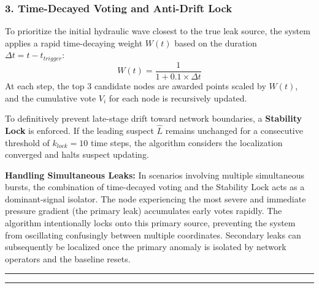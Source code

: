 \documentclass[final,5p,times,twocolumn,authoryear]{elsarticle}
\begin{document}
\subsubsection{3. Time-Decayed Voting and Anti-Drift Lock}
To prioritize the initial hydraulic wave closest to the true leak source, the system applies a rapid time-decaying weight $W(t)$ based on the duration $\Delta t = t - t_{trigger}$:
\begin{equation}
    W(t) = \frac{1}{1 + 0.1 \times \Delta t}
\end{equation}
At each step, the top 3 candidate nodes are awarded points scaled by $W(t)$, and the cumulative vote $V_i$ for each node is recursively updated.

To definitively prevent late-stage drift toward network boundaries, a \textbf{Stability Lock} is enforced. If the leading suspect $\hat{L}$ remains unchanged for a consecutive threshold of $k_{lock} = 10$ time steps, the algorithm considers the localization converged and halts suspect updating.

\textbf{Handling Simultaneous Leaks:} In scenarios involving multiple simultaneous bursts, the combination of time-decayed voting and the Stability Lock acts as a dominant-signal isolator. The node experiencing the most severe and immediate pressure gradient (the primary leak) accumulates early votes rapidly. The algorithm intentionally locks onto this primary source, preventing the system from oscillating confusingly between multiple coordinates. Secondary leaks can subsequently be localized once the primary anomaly is isolated by network operators and the baseline resets.

\vspace{10pt}
\noindent\rule{\columnwidth}{0.8pt}
\label{alg:leak_localization}
\vspace{-8pt}
\noindent\rule{\columnwidth}{0.4pt}
\end{document}
